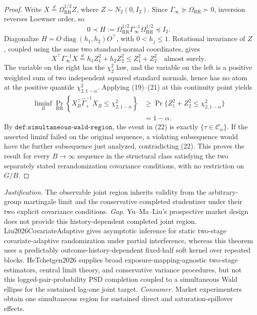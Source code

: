 \documentclass{article}
\begin{document}
\begin{proof}
Write \(X\stackrel d=\Omega_{\mathrm{RR}}^{1/2}Z\), where \(Z\sim N_2(0,I_2)\).  Since \(\Gamma_\infty\succeq\Omega_{\mathrm{RR}}\succ0\), inversion reverses Loewner order, so
\[
 0\prec
 H:=\Omega_{\mathrm{RR}}^{1/2}
       \Gamma_\infty^{-1}
       \Omega_{\mathrm{RR}}^{1/2}
 \preceq I_2.                                               \tag{20}
\]
Diagonalize \(H=O\operatorname{diag}(h_1,h_2)O^\top\), with \(0<h_j\leq1\).  Rotational invariance of \(Z\), coupled using the same two standard-normal coordinates, gives
\[
 X^\top\Gamma_\infty^{-1}X
 \stackrel d=h_1Z_1^2+h_2Z_2^2
 \leq Z_1^2+Z_2^2
 \quad\text{almost surely}.                                \tag{21}
\]
The variable on the right has the \(\chi^2_2\) law, and the variable on the left is a positive weighted sum of two independent squared standard normals, hence has no atom at the positive quantile \(\chi^2_{2,1-\alpha}\).  Applying (19)--(21) at this continuity point yields
\[
 \begin{aligned}
 \liminf_B\Pr_{\mathrm{RR}}\!\left\{
  X_B^\top\widehat\Gamma_+^{-1}X_B
  \leq\chi^2_{2,1-\alpha}\right\}
 &\geq
 \Pr\{Z_1^2+Z_2^2\leq\chi^2_{2,1-\alpha}\}\\
 &=1-\alpha.                                                \tag{22}
 \end{aligned}
\]
By \(\texttt{def:simultaneous-wald-region}\), the event in (22) is exactly \(\{\tau\in\mathcal C_\alpha\}\).  If the asserted liminf failed on the original sequence, a violating subsequence would have the further subsequence just analyzed, contradicting (22).  This proves the result for every \(B\to\infty\) sequence in the structural class satisfying the two separately stated rerandomization covariance conditions, with no restriction on \(G/B\).
\end{proof}
\par\smallskip\noindent \textit{Justification.} The observable joint region inherits validity from the arbitrary-group martingale limit and the conservative completed studentizer under their two explicit covariance conditions. \textit{Gap.} Yu--Ma--Liu's prospective market design does not provide this history-dependent completed joint region. Liu2026CovariateAdaptive gives asymptotic inference for static two-stage covariate-adaptive randomization under partial interference, whereas this theorem uses a predictably outcome-history-dependent fixed-half soft kernel over repeated blocks. HeTchetgen2026 supplies broad exposure-mapping-agnostic two-stage estimators, central limit theory, and conservative variance procedures, but not this logged-pair-probability PSD completion coupled to a simultaneous Wald ellipse for the sustained lag-one joint target. \textit{Consumer.} Market experimenters obtain one simultaneous region for sustained direct and saturation-spillover effects.
\end{document}
